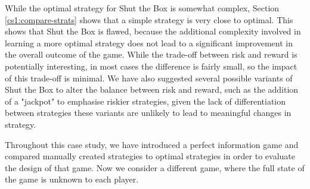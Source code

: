While the optimal strategy for Shut the Box is somewhat complex, Section \ref{cs1:compare-strats} shows that a simple strategy is very close to optimal. This shows that Shut the Box is flawed, because the additional complexity involved in learning a more optimal strategy does not lead to a significant improvement in the overall outcome of the game. While the trade-off between risk and reward is potentially interesting, in most cases the difference is fairly small, so the impact of this trade-off is minimal. We have also suggested several possible variants of Shut the Box to alter the balance between risk and reward, such as the addition of a "jackpot" to emphasise riskier strategies, given the lack of differentiation between strategies these variants are unlikely to lead to meaningful changes in strategy.

Throughout this case study, we have introduced a perfect information game and compared manually created strategies to optimal strategies in order to evaluate the design of that game. Now we consider a different game, where the full state of the game is unknown to each player.